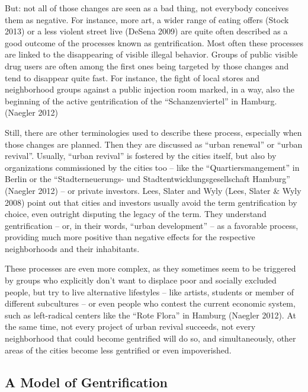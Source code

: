 \documentclass[a4paper,
fontsize=11pt,
oneside,
numbers=noperiodatend,
parskip=half-,
bibliography=totoc,
final
]{scrartcl}
\begin{document}
But: not all of those changes are seen as a bad thing, not everybody
conceives them as negative. For instance, more art, a wider range of
eating offers (Stock 2013) or a less violent street live (DeSena 2009)
are quite often described as a good outcome of the processes known as
gentrification. Most often these processes are linked to the
disappearing of visible illegal behavior. Groups of public visible drug
users are often among the first ones being targeted by those changes and
tend to disappear quite fast. For instance, the fight of local stores
and neighborhood groups against a public injection room marked, in a
way, also the beginning of the active gentrification of the
\enquote{Schanzenviertel} in Hamburg. (Naegler 2012)

Still, there are other terminologies used to describe these process,
especially when those changes are planned. Then they are discussed as
\enquote{urban renewal} or \enquote{urban revival}. Usually,
\enquote{urban revival} is fostered by the cities itself, but also by
organizations commissioned by the cities too -- like the
\enquote{Quartiersmangement} in Berlin or the \enquote{Stadterneuerungs-
und Stadtentwicklungsgesellschaft Hamburg} (Naegler 2012) -- or private
investors. Lees, Slater and Wyly (Lees, Slater \& Wyly 2008) point out
that cities and investors usually avoid the term gentrification by
choice, even outright disputing the legacy of the term. They understand
gentrification -- or, in their words, \enquote{urban development} -- as
a favorable process, providing much more positive than negative effects
for the respective neighborhoods and their inhabitants.

These processes are even more complex, as they sometimes seem to be
triggered by groups who explicitly don't want to displace poor and
socially excluded people, but try to live alternative lifestyles -- like
artists, students or member of different subcultures -- or even people
who contest the current economic system, such as left-radical centers
like the \enquote{Rote Flora} in Hamburg (Naegler 2012). At the same
time, not every project of urban revival succeeds, not every
neighborhood that could become gentrified will do so, and
simultaneously, other areas of the cities become less gentrified or even
impoverished.

\subsection{A Model of Gentrification}\label{a-model-of-gentrification}
\end{document}
